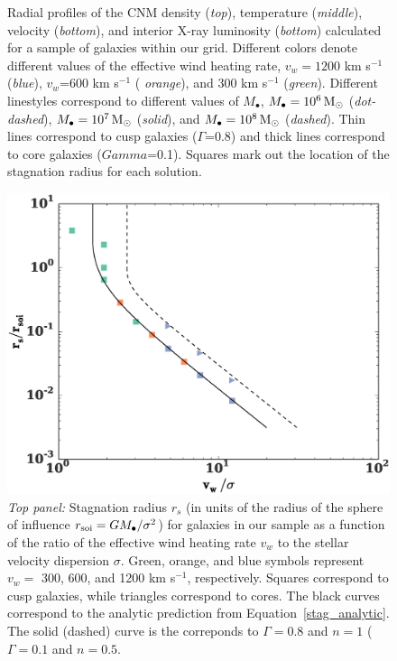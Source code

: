 \documentclass[usenatbib,fleqn]{mn2e}
\newcommand{\Mbh}[1][]{M_{\bullet#1}}
\newcommand{\vwO}{v_{w}}
\begin{document}
\begin{figure}
  \caption{\label{fig:profiles}Radial profiles of the CNM density
    ({\it top}), temperature ({\it middle}), velocity ({\it bottom}),
    and interior X-ray luminosity ({\it bottom}) calculated for a
    sample of galaxies within our grid.  Different colors
    denote different values of the effective wind heating rate,
    $\vwO=1200$ km s$^{-1}$ ({\it blue}), $\vwO$=600 km s$^{-1}$ ({\it
      orange}), and 300 km s$^{-1}$ ({\it green}).  Different
    linestyles correspond to different values of $\Mbh$, $\Mbh=10^6
    \Msun$ ({\it dot-dashed}), $\Mbh=10^7 \Msun$ ({\it solid}), and
    $\Mbh=10^8 \Msun$ ({\it dashed}). Thin lines correspond to cusp
    galaxies ($\Gamma$=0.8) and thick lines correspond to core
    galaxies ($Gamma$=0.1). Squares mark out the location of
    the stagnation radius for each solution.
 }
\end{figure}

\begin{figure}
  \includegraphics[width=\columnwidth]{rs.eps}
  \caption{\label{fig:stag} \emph{Top panel:} Stagnation radius
    $r_{s}$ (in units of the radius of the sphere of influence $r_{\rm
      soi} = GM_{\bullet}/\sigma^{2}$) for galaxies in our sample as a
    function of the ratio of the effective wind heating rate $v_{w}$
    to the stellar velocity dispersion $\sigma$.  Green, orange, and
    blue symbols represent $v_{w} =$ 300, 600, and 1200 km s$^{-1}$,
    respectively.  Squares correspond to cusp galaxies, while
    triangles correspond to cores. The black curves correspond to the
    analytic prediction from Equation~\eqref{stag_analytic}. The solid
    (dashed) curve is the correponds to $\Gamma=0.8$ and $n=1$
    ($\Gamma=0.1$ and $n=0.5$.}
\end{figure}
\end{document}
